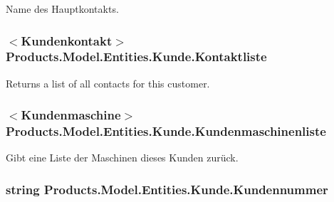 Name des Hauptkontakts. 

\subsubsection[{\texorpdfstring{Kontaktliste}{Kontaktliste}}]{$<${\bf Kundenkontakt}$>$ Products.\+Model.\+Entities.\+Kunde.\+Kontaktliste\hspace{0.3cm}{\ttfamily [get]}}\hypertarget{class_products_1_1_model_1_1_entities_1_1_kunde_a9e740954815dccf75d837b573da2801e}{}\label{class_products_1_1_model_1_1_entities_1_1_kunde_a9e740954815dccf75d837b573da2801e}


Returns a list of all contacts for this customer. 

\subsubsection[{\texorpdfstring{Kundenmaschinenliste}{Kundenmaschinenliste}}]{$<${\bf Kundenmaschine}$>$ Products.\+Model.\+Entities.\+Kunde.\+Kundenmaschinenliste\hspace{0.3cm}{\ttfamily [get]}}\hypertarget{class_products_1_1_model_1_1_entities_1_1_kunde_a17dd85fea2b3bd29483fcfa15a3cfccb}{}\label{class_products_1_1_model_1_1_entities_1_1_kunde_a17dd85fea2b3bd29483fcfa15a3cfccb}


Gibt eine Liste der Maschinen dieses Kunden zurück. 

\subsubsection[{\texorpdfstring{Kundennummer}{Kundennummer}}]{\setlength{\rightskip}{0pt plus 5cm}string Products.\+Model.\+Entities.\+Kunde.\+Kundennummer\hspace{0.3cm}{\ttfamily [get]}}\hypertarget{class_products_1_1_model_1_1_entities_1_1_kunde_a23299a9f4e46ee3f20f2806243f9a0a7}{}\label{class_products_1_1_model_1_1_entities_1_1_kunde_a23299a9f4e46ee3f20f2806243f9a0a7}


